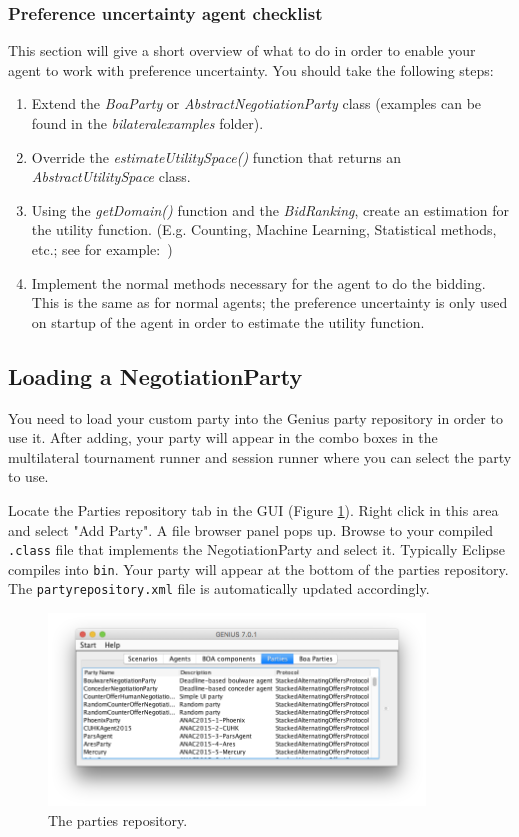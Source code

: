 \documentclass[]{article}
\newcommand\Genius{{\sc Genius}}
\begin{document}
\subsubsection{Preference uncertainty agent checklist}
This section will give a short overview of what to do in order to enable your agent to work with preference uncertainty. You should take the following steps:
\begin{enumerate}
    \item Extend the \textit{BoaParty} or \textit{AbstractNegotiationParty} class (examples can be found in the \textit{bilateralexamples} folder).
    \item Override the \textit{estimateUtilitySpace()} function that returns an \textit{AbstractUtilitySpace} class.
    \item Using the \textit{getDomain()} function and the \textit{BidRanking}, create an estimation for the utility function. (E.g. Counting, Machine Learning, Statistical methods, etc.; see for example:~\cite{Ayd14,BaarslagValueOfInformation,UTAGMS,Ros16,Sri73,Tsi18,Zin18})
    \item Implement the normal methods necessary for the agent to do the bidding. This is the same as for normal agents; the preference uncertainty is only used on startup of the agent in order to estimate the utility function.
\end{enumerate}


\subsection{Loading a NegotiationParty}

You need to load your custom party into the {\Genius} party repository in order to use it. After adding, your party will appear in the combo boxes in the multilateral tournament runner and session runner where you can select the party to use.

Locate the Parties repository tab in the GUI (Figure \ref{fig:partiesrepo}). Right click in this area and select "Add Party". A file browser panel pops up. Browse to  your compiled \verb|.class| file that implements the NegotiationParty and select it. Typically Eclipse compiles into \verb|bin|. Your party will appear at the bottom of the parties repository. The \verb|partyrepository.xml| file is automatically updated accordingly.

\begin{figure}[h!] 
	\center
	\includegraphics[width=10cm]{media/partiesrepo.png}
	\caption{The parties repository.}
	\label{fig:partiesrepo}
\end{figure}
\end{document}
